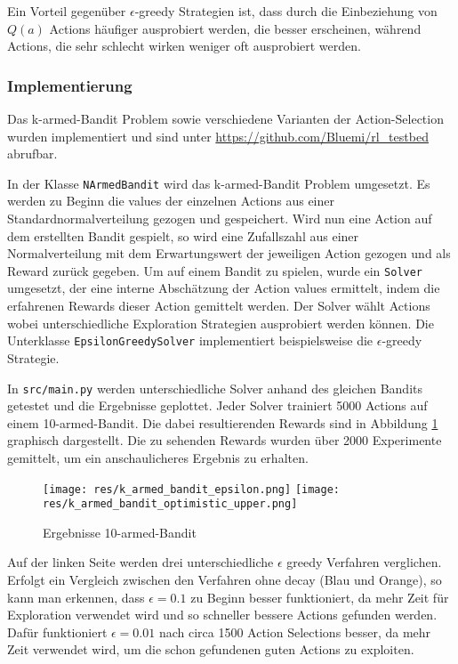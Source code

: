 \documentclass[11pt]{scrartcl}
\begin{document}
Ein Vorteil gegenüber $\epsilon$-greedy Strategien ist, dass durch die Einbeziehung von
$Q(a)$ Actions häufiger ausprobiert werden, die besser erscheinen, während Actions, die
sehr schlecht wirken weniger oft ausprobiert werden.

\subsubsection{Implementierung}
Das k-armed-Bandit Problem sowie verschiedene Varianten der Action-Selection wurden
implementiert und sind unter \url{https://github.com/Bluemi/rl_testbed} abrufbar.

In der Klasse \lstinline!NArmedBandit! wird das k-armed-Bandit Problem umgesetzt. Es
werden zu Beginn die values der einzelnen Actions aus einer Standardnormalverteilung
gezogen und gespeichert. Wird nun eine Action auf dem erstellten Bandit gespielt, so wird
eine Zufallszahl aus einer Normalverteilung mit dem Erwartungswert der jeweiligen Action
gezogen und als Reward zurück gegeben.
Um auf einem Bandit zu spielen, wurde ein \lstinline!Solver! umgesetzt, der eine interne
Abschätzung der Action values ermittelt, indem die erfahrenen Rewards dieser Action
gemittelt werden. Der Solver wählt Actions wobei unterschiedliche Exploration Strategien
ausprobiert werden können. Die Unterklasse \lstinline!EpsilonGreedySolver! implementiert
beispielsweise die $\epsilon$-greedy Strategie.

In \lstinline!src/main.py! werden unterschiedliche Solver anhand des gleichen Bandits
getestet und die Ergebnisse geplottet. Jeder Solver trainiert 5000 Actions auf einem
10-armed-Bandit. Die dabei resultierenden Rewards sind in Abbildung
\ref{fig:karmed_bandit} graphisch dargestellt. Die zu sehenden Rewards wurden über 2000
Experimente gemittelt, um ein anschaulicheres Ergebnis zu erhalten.

\begin{figure}[htp]
\centering
\texttt{[image: res/k\_armed\_bandit\_epsilon.png]}
\texttt{[image: res/k\_armed\_bandit\_optimistic\_upper.png]}
\caption{Ergebnisse 10-armed-Bandit}
\label{fig:karmed_bandit}
\end{figure}

\noindent
Auf der linken Seite werden drei unterschiedliche $\epsilon$ greedy Verfahren verglichen.
Erfolgt ein Vergleich zwischen den Verfahren ohne decay (Blau und Orange), so kann man
erkennen, dass $\epsilon = 0.1$ zu Beginn besser funktioniert, da mehr Zeit für
Exploration verwendet wird und so schneller bessere Actions gefunden werden. Dafür
funktioniert $\epsilon = 0.01$ nach circa 1500 Action Selections besser, da mehr Zeit
verwendet wird, um die schon gefundenen guten Actions zu exploiten.
\end{document}
